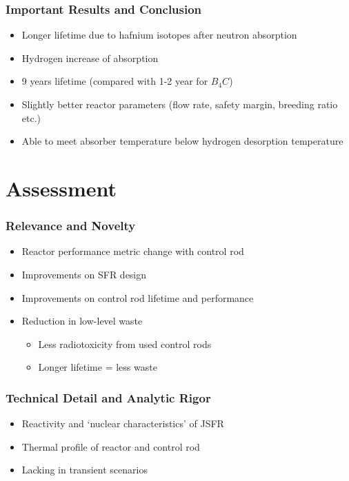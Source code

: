 \documentclass[9pt]{beamer}
\newcommand{\bc}{$B_4C$\xspace}
\begin{document}
\begin{frame}
\frametitle{Important Results and Conclusion}
\begin{itemize}
  \item Longer lifetime due to hafnium isotopes after neutron absorption
  \item Hydrogen increase of absorption
  \item 9 years lifetime (compared with 1-2 year for \bc)
  \item Slightly better reactor parameters (flow rate, safety margin, breeding ratio etc.)
  \item Able to meet absorber temperature below hydrogen desorption temperature
\end{itemize}
\end{frame}

\section{Assessment}


\begin{frame}
\frametitle{Relevance and Novelty}
\begin{itemize}
  \item Reactor performance metric change with control rod
  \item Improvements on \gls{SFR} design
  \item Improvements on control rod lifetime and performance
  \item Reduction in low-level waste
    \begin{itemize}
        \item Less radiotoxicity from used control rods
        \item Longer lifetime = less waste
    \end{itemize}
\end{itemize}
\end{frame}

\begin{frame}
\frametitle{Technical Detail and Analytic Rigor}
\begin{itemize}
    \item Reactivity and `nuclear characteristics' of \gls{JSFR}
    \item Thermal profile of reactor and control rod
    \item Lacking in transient scenarios
\end{itemize}
\end{frame}
\end{document}
